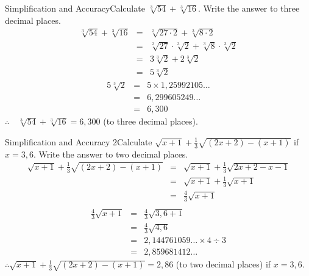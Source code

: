 
\begin{wex}{Simplification and Accuracy}{Calculate $\sqrt[3]{54}+\sqrt[3]{16}$. Write the answer to three decimal places.}{
\begin{eqnarray*}
\sqrt[3]{54}+\sqrt[3]{16}&=&\sqrt[3]{27 \cdot 2}+\sqrt[3]{8 \cdot 2}\\
&=&\sqrt[3]{27} \cdot \sqrt[3]{2}+\sqrt[3]{8} \cdot \sqrt[3]{2}\\
&=&3 \sqrt[3]{2}+2 \sqrt[3]{2}\\
&=&5 \sqrt[3]{2}
\end{eqnarray*}
\begin{eqnarray*}
5 \sqrt[3]{2}&=&5 \times 1,25992105\ldots\\
&=&6,299605249\ldots\\
&=&6,300
\end{eqnarray*}
$\therefore \quad \sqrt[3]{54}+\sqrt[3]{16}=6,300$ (to three decimal places).}
\end{wex}

\begin{wex}{Simplification and Accuracy 2}{Calculate $\sqrt{x+1}+\frac{1}{3}\sqrt{(2x+2)-(x+1)}$ if $x=3,6$. Write the answer to two decimal places.}{
\begin{eqnarray*}
\sqrt{x+1}+\frac{1}{3}\sqrt{(2x+2)-(x+1)}&=&\sqrt{x+1}+\frac{1}{3}\sqrt{2x+2-x-1}\\
&=&\sqrt{x+1}+\frac{1}{3}\sqrt{x+1}\\
&=&\frac{4}{3}\sqrt{x+1}\\
\end{eqnarray*}
\begin{eqnarray*}
\frac{4}{3}\sqrt{x+1}&=&\frac{4}{3}\sqrt{3,6+1}\\
&=&\frac{4}{3}\sqrt{4,6}\\
&=&2,144761059 \ldots \times 4 \div 3\\
&=&2,859681412 \ldots
\end{eqnarray*}
$\therefore \sqrt{x+1}+\frac{1}{3}\sqrt{(2x+2)-(x+1)}=2,86$ (to two decimal places) if $x=3,6$.}
\end{wex}

